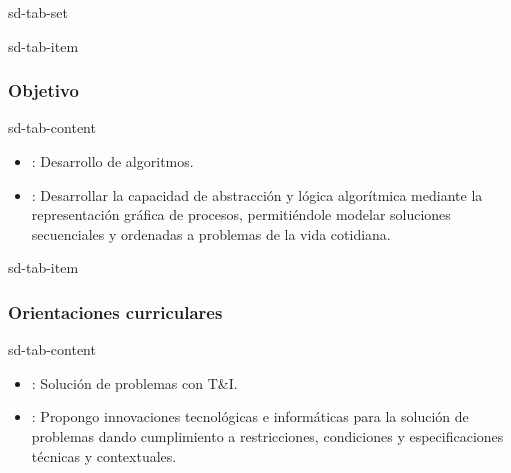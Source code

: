 \documentclass[letterpaper,10pt,spanish]{sphinxmanual}
\begin{document}
\begin{sphinxuseclass}{sd-tab-set}
\begin{sphinxuseclass}{sd-tab-item}\subsubsection*{Objetivo}

\begin{sphinxuseclass}{sd-tab-content}
\sphinxAtStartPar
{}
\begin{itemize}
\item {} 
\sphinxAtStartPar
{}: Desarrollo de algoritmos.

\item {} 
\sphinxAtStartPar
{}: Desarrollar la capacidad de abstracción y lógica algorítmica mediante la representación gráfica de procesos, permitiéndole modelar soluciones secuenciales y ordenadas a problemas de la vida cotidiana.

\end{itemize}

\end{sphinxuseclass}
\end{sphinxuseclass}
\begin{sphinxuseclass}{sd-tab-item}\subsubsection*{Orientaciones curriculares}

\begin{sphinxuseclass}{sd-tab-content}\begin{itemize}
\item {} 
\sphinxAtStartPar
{}: Solución de problemas con T\&I.

\item {} 
\sphinxAtStartPar
{}: Propongo innovaciones tecnológicas e informáticas para la solución de problemas dando cumplimiento a restricciones, condiciones y especificaciones técnicas y contextuales.


\end{itemize}
\end{sphinxuseclass}
\end{sphinxuseclass}
\end{sphinxuseclass}
\end{document}
